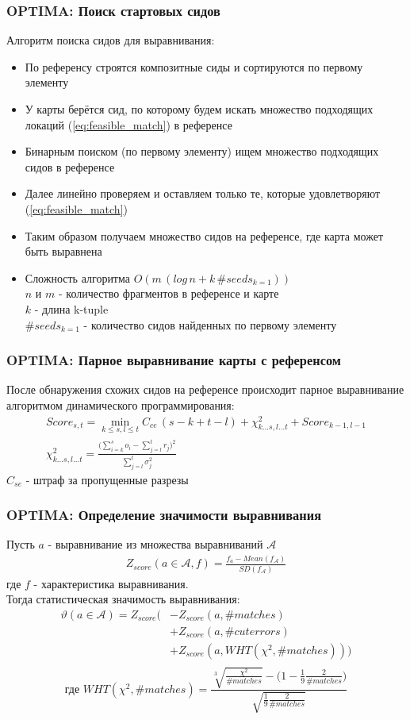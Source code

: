 \begin{frame}
\frametitle{OPTIMA: Поиск стартовых сидов}
Алгоритм поиска сидов для выравнивания:
\begin{itemize}
  \item По референсу строятся композитные сиды и сортируются по первому элементу
  \item У карты берётся сид, по которому будем искать множество подходящих локаций (\ref{eq:feasible_match}) в референсе
  \item Бинарным поиском (по первому элементу) ищем множество подходящих сидов в референсе
  \item Далее линейно проверяем и оставляем только те, которые удовлетворяют (\ref{eq:feasible_match})
  \item Таким образом получаем множество сидов на референсе, где карта может быть выравнена
  \item Сложность алгоритма $O(m \, (log \, n + k \, \#seeds_{k=1}))$\\
  $n$ и $m$ - количество фрагментов в референсе и карте \\
  $k$ - длина k-tuple \\
  $\#seeds_{k=1}$ - количество сидов найденных по первому элементу
\end{itemize}
\end{frame}

\begin{frame}
\frametitle{OPTIMA: Парное выравнивание карты с референсом}
После обнаружения схожих сидов на референсе происходит парное выравнивание алгоритмом динамического программирования:
\begin{gather*}
Score_{s,t} = \min\limits_{k \le s, l \le t} C_{ce} \, (s - k + t - l) + \chi_{k \dots s, l \dots t}^2 + Score_{k-1,l-1} \\
\chi_{k \dots s, l \dots t}^2 = \frac{\bigg(\sum\limits_{i = k}^s o_i - \sum\limits_{j = l}^t r_j \bigg)^2}{\sum\limits_{j = l}^t\sigma_j^2}
\end{gather*}
$C_{se}$ - штраф за пропущенные разрезы
\end{frame}

\begin{frame}
\frametitle{OPTIMA: Определение значимости выравнивания}
Пусть $a$ - выравнивание из множества выравниваний $\mathcal{A}$
\begin{gather*}
Z_{score}(a \in \mathcal{A}, f) = \frac{f_{a} - Mean(f_{\mathcal{A}})}{SD(f_{\mathcal{A}})}
\end{gather*}
где $f$ - характеристика выравнивания.\\
 Тогда статистическая значимость выравнивания:
\begin{align*}
  \vartheta (a \in \mathcal{A}) = Z_{score}( & -Z_{score}(a, \#matches) \\
  & + Z_{score}(a, \#cuterrors) \\
  & + Z_{score}(a, WHT(\chi^2, \#matches))) \\
\end{align*}
\[\text{где } WHT(\chi^2, \#matches) = \frac{\sqrt[3]{\frac{\chi^2}{\#matches}} - \big(1 - \frac{1}{9} \frac{2}{\#matches}\big)}{\sqrt{\frac{1}{9} \frac{2}{\#matches}}}\]
\end{frame}

